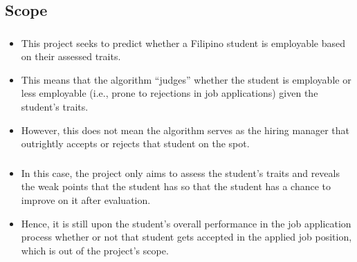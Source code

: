 \subsection{Scope}
\begin{frame}
\frametitle{\subsecname}
	\begin{itemize}
		\item This project seeks to predict whether a Filipino student is employable based on their assessed traits.
		\item This means that the algorithm ``judges'' whether the student is employable or less employable (i.e., prone to rejections in job applications) given the student's traits.
		\item However, this does not mean the algorithm serves as the hiring manager that outrightly accepts or rejects that student on the spot.
	\end{itemize}
\end{frame}

\begin{frame}
\frametitle{\subsecname}
	\begin{itemize}
		\item In this case, the project only aims to assess the student's traits and reveals the weak points that the student has so that the student has a chance to improve on it after evaluation.
		\item Hence, it is still upon the student's overall performance in the job application process whether or not that student gets accepted in the applied job position, which is out of the project's scope.
	\end{itemize}
\end{frame}

